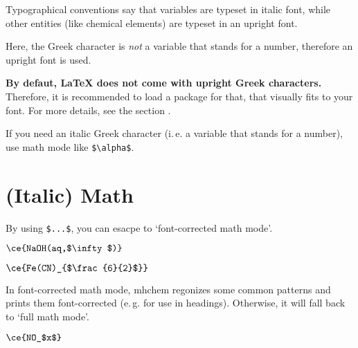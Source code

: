 \documentclass[a4paper,notitlepage,parskip=half]{scrreprt}
\begin{document}
Typographical conventions say that variables are typeset in italic font, while other entities (like chemical elements) are typeset in an upright font.

Here, the Greek character is \emph{not} a variable that stands for a number, therefore an upright font is used.

\begin{SideBySideExample}[xrightmargin=4cm]
\end{SideBySideExample}

\begin{SideBySideExample}[xrightmargin=4cm]
  \ce{[Pt(\eta^2-C2H4)Cl3]-}
\end{SideBySideExample}

\textbf{By defaut, \LaTeX{} does not come with upright Greek characters.} Therefore, it is recommended to load a package for that, that visually fits to your font. For more details, see the section .

If you need an italic Greek character (i.\,e. a variable that stands for a number), use math mode like \verb|$\alpha$|.


\section{(Italic) Math}

By using \verb|$...$|, you can esacpe to `font-corrected math mode'.

\begin{SideBySideExample}[xrightmargin=4cm]
  $\ce{NaOH(aq,$\infty$)}$\\
  \sffamily\bfseries
\end{SideBySideExample}

\begin{SideBySideExample}[xrightmargin=4cm]
  $\ce{Fe(CN)_{$\frac{6}{2}$}}$\\
  \sffamily\bfseries
\end{SideBySideExample}

In font-corrected math mode, mhchem regonizes some common patterns and prints them font-corrected (e.\,g. for use in headings). Otherwise, it will fall back to `full math mode'.

\begin{SideBySideExample}[xrightmargin=4cm]
  $\ce{NO_$x$}$ \sffamily\bfseries {}
\end{SideBySideExample}
\end{document}

